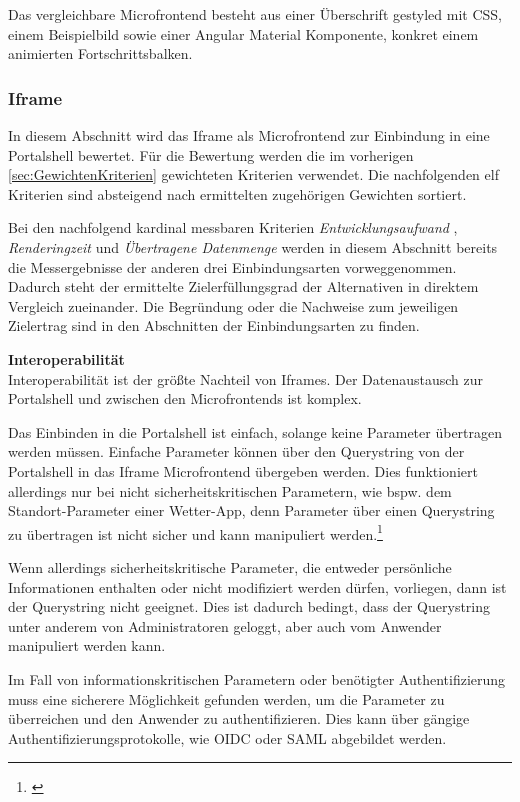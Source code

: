 Das vergleichbare Microfrontend besteht aus einer Überschrift gestyled mit \gls{CSS}, einem Beispielbild sowie einer Angular Material Komponente, konkret einem animierten Fortschrittsbalken.

\subsubsection{Iframe}\label{sec:EvaluierungIFrame}

In diesem Abschnitt wird das Iframe als Microfrontend zur Einbindung in eine Portalshell bewertet. Für die Bewertung werden die im vorherigen \cref{sec:GewichtenKriterien} gewichteten Kriterien verwendet. Die nachfolgenden elf Kriterien sind absteigend nach ermittelten zugehörigen Gewichten sortiert.

Bei den nachfolgend kardinal messbaren Kriterien \textit{Entwicklungsaufwand} , \textit{Renderingzeit} und \textit{Übertragene Datenmenge} werden in diesem Abschnitt bereits die Messergebnisse der anderen drei Einbindungsarten vorweggenommen. Dadurch steht der ermittelte Zielerfüllungsgrad der Alternativen in direktem Vergleich zueinander. Die Begründung oder die Nachweise zum jeweiligen Zielertrag sind in den Abschnitten der Einbindungsarten zu finden.

\textbf{Interoperabilität}\\
Interoperabilität ist der größte Nachteil von Iframes. Der Datenaustausch zur Portalshell und zwischen den Microfrontends ist komplex.

Das Einbinden in die Portalshell ist einfach, solange keine Parameter übertragen werden müssen. Einfache Parameter können über den Querystring von der Portalshell in das Iframe Microfrontend übergeben werden. Dies funktioniert allerdings nur bei nicht sicherheitskritischen Parametern, wie bspw. dem Standort-Parameter einer Wetter-App, denn Parameter über einen Querystring zu übertragen ist nicht sicher und kann manipuliert werden.\footnote{\cite[vgl.][35]{Mezzalira2021}}

Wenn allerdings sicherheitskritische Parameter, die entweder persönliche Informationen enthalten oder nicht modifiziert werden dürfen, vorliegen, dann ist der Querystring nicht geeignet. Dies ist dadurch bedingt, dass der Querystring unter anderem von Administratoren geloggt, aber auch vom Anwender manipuliert werden kann.

Im Fall von informationskritischen Parametern oder benötigter Authentifizierung muss eine sicherere Möglichkeit gefunden werden, um die Parameter zu überreichen und den Anwender zu authentifizieren. Dies kann über gängige Authentifizierungsprotokolle, wie \gls{OIDC} oder \gls{SAML} abgebildet werden.

